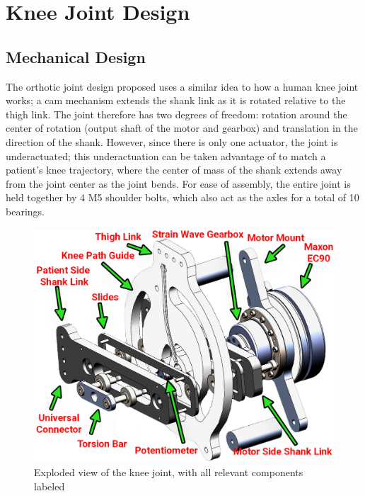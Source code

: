 \chapter{Knee Joint Design}



\section{Mechanical Design}

The orthotic joint design proposed uses a similar idea to how a human knee joint works; a cam mechanism  extends the shank link as it is rotated relative to the thigh link. The joint therefore has two degrees of freedom: rotation around the center of rotation (output shaft of the motor and gearbox) and translation in the direction of the shank. However, since there is only one actuator, the joint is underactuated; this underactuation can be taken advantage of to match a patient's knee trajectory, where the center of mass of the shank extends away from the joint center as the joint bends. For ease of assembly, the entire joint is held together by 4 M5 shoulder bolts, which also act as the axles for a total of 10 bearings. 

\begin{figure} [ht!]
    \centering
    \includegraphics[width=0.8\linewidth]{Figures/Design/ExoKneeExplodedView.png}
    \caption{Exploded view of the knee joint, with all relevant components labeled}
    \label{fig:KneeJointExplodedView}
\end{figure}

